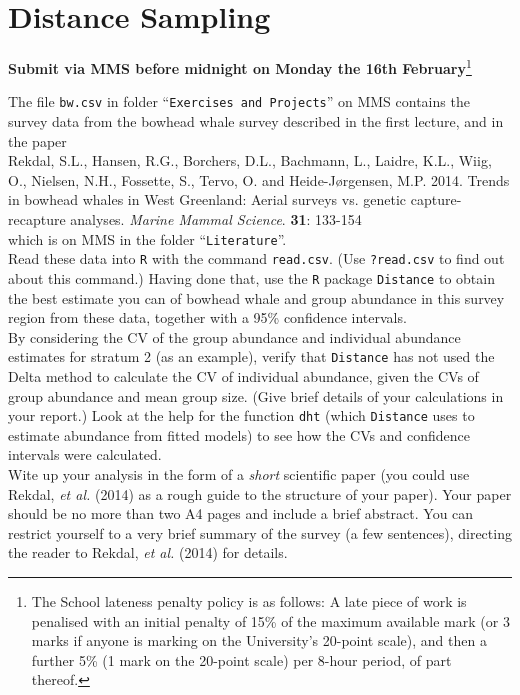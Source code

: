 \chapter{Distance Sampling\label{sec:dist_proj}}

\begin{center}
\textbf{Submit via MMS before midnight on Monday the 16th February}\footnote{The School lateness penalty policy is as follows: A late piece of work is penalised with an initial penalty of 15\% of the maximum available mark (or 3 marks if anyone is marking on the University's 20-point scale), and then a further 5\% (1 mark on the 20-point scale) per 8-hour period, of part thereof.}
\end{center}

The file \verb|bw.csv| in folder ``\verb|Exercises and Projects|'' on MMS contains the survey data from the bowhead whale survey described in the first lecture, and in the paper \\

Rekdal, S.L., Hansen, R.G., Borchers, D.L., Bachmann, L., Laidre, K.L., Wiig, O., Nielsen, N.H., Fossette, S., Tervo, O. and Heide-J{\o}rgensen, M.P. 2014. Trends in bowhead whales in West Greenland: Aerial surveys vs. genetic capture-recapture analyses. \textit{Marine Mammal Science}. \textbf{31}: 133-154\\

which is on MMS in the folder ``\verb|Literature|''.\\

Read these data into \verb|R| with the command \verb|read.csv|. (Use \verb|?read.csv| to find out about this command.) Having done that, use the \verb|R| package \verb|Distance| to obtain the best estimate you can of bowhead whale and group abundance in this survey region from these data, together with a 95\% confidence intervals. \\

By considering the CV of the group abundance and individual abundance estimates for stratum 2 (as an example), verify that \verb|Distance| has not used the Delta method to calculate the CV of individual abundance, given the CVs of group abundance and mean group size. (Give brief details of your calculations in your report.) Look at the help for the function \verb|dht| (which \verb|Distance| uses to estimate abundance from fitted models) to see how the CVs and confidence intervals were calculated. \\

Wite up your analysis in the form of a \textit{short} scientific paper (you could use Rekdal, \textit{et al.} (2014) as a rough guide to the structure of your paper). Your paper should be no more than two A4 pages and include a brief abstract. You can restrict yourself to a very brief summary of the survey (a few sentences), directing the reader to Rekdal, \textit{et al.} (2014) for details. \\

